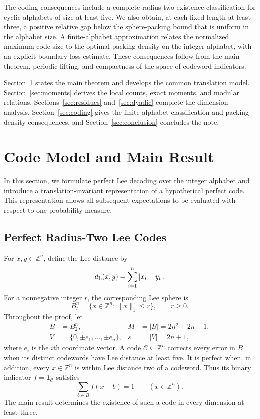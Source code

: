 \documentclass[12pt,letterpaper,onecolumn]{article}
\theoremstyle{definition}
\newcommand{\Z}{\mathbb{Z}}
\newcommand{\C}{\mathcal{C}}
\newcommand{\norm}[1]{\lVert #1\rVert_1}
\newcommand{\card}[1]{\lvert #1\rvert}
\begin{document}
The coding consequences include a complete radius-two existence classification for cyclic alphabets of size at least five. We also obtain, at each fixed length at least three, a positive relative gap below the sphere-packing bound that is uniform in the alphabet size. A finite-alphabet approximation relates the normalized maximum code size to the optimal packing density on the integer alphabet, with an explicit boundary-loss estimate. These consequences follow from the main theorem, periodic lifting, and compactness of the space of codeword indicators.

Section~\ref{sec:model} states the main theorem and develops the common translation model. Section~\ref{sec:moments} derives the local counts, exact moments, and modular relations. Sections~\ref{sec:residues} and~\ref{sec:dyadic} complete the dimension analysis. Section~\ref{sec:coding} gives the finite-alphabet classification and packing-density consequences, and Section~\ref{sec:conclusion} concludes the note.

 \section{Code Model and Main Result}\label{sec:model}
In this section, we formulate perfect Lee decoding over the integer alphabet and introduce a translation-invariant representation of a hypothetical perfect code. This representation allows all subsequent expectations to be evaluated with respect to one probability measure.

\subsection{Perfect Radius-Two Lee Codes}
For $x,y\in\Z^n$, define the Lee distance by
\begin{equation}\label{eq:distance}
 d_{\rm L}(x,y)=\sum_{i=1}^n|x_i-y_i|.
\end{equation}
For a nonnegative integer $r$, the corresponding Lee sphere is
\begin{equation}\label{eq:spheres}
 B_r^n=\{x\in\Z^n:\norm{x}\le r\},\qquad r\ge0.
\end{equation}
Throughout the proof, let
\begin{align}
 B&=B_2^n,& M&=\card{B}=2n^2+2n+1,\label{eq:volume}\\
 V&=\{0,\pm e_1,\ldots,\pm e_n\},&s&=\card{V}=2n+1,\label{eq:unit}
\end{align}
where $e_i$ is the $i$th coordinate vector. A code $\C\subseteq\Z^n$ corrects every error in $B$ when its distinct codewords have Lee distance at least five. It is perfect when, in addition, every $x\in\Z^n$ is within Lee distance two of a codeword. Thus its binary indicator $f=\mathbf1_\C$ satisfies
\begin{equation}\label{eq:tiling}
 \sum_{b\in B}f(x-b)=1\qquad(x\in\Z^n).
\end{equation}
The main result determines the existence of such a code in every dimension at least three.
\end{document}
